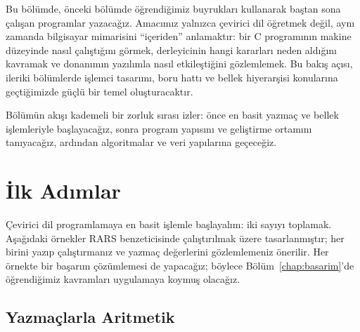 Bu bölümde, önceki bölümde öğrendiğimiz buyrukları kullanarak baştan sona çalışan programlar yazacağız. Amacımız yalnızca çevirici dil öğretmek değil, aynı zamanda bilgisayar mimarisini ``içeriden'' anlamaktır: bir C programının makine düzeyinde nasıl çalıştığını görmek, derleyicinin hangi kararları neden aldığını kavramak ve donanımın yazılımla nasıl etkileştiğini gözlemlemek. Bu bakış açısı, ileriki bölümlerde işlemci tasarımı, boru hattı ve bellek hiyerarşisi konularına geçtiğimizde güçlü bir temel oluşturacaktır.

Bölümün akışı kademeli bir zorluk sırası izler: önce en basit yazmaç ve bellek işlemleriyle başlayacağız, sonra program yapısını ve geliştirme ortamını tanıyacağız, ardından algoritmalar ve veri yapılarına geçeceğiz.


\section{İlk Adımlar}
\label{sec:ilk-adimlar}

Çevirici dil programlamaya en basit işlemle başlayalım: iki sayıyı toplamak. Aşağıdaki örnekler RARS benzeticisinde çalıştırılmak üzere tasarlanmıştır; her birini yazıp çalıştırmanız ve yazmaç değerlerini gözlemlemeniz önerilir. Her örnekte bir başarım çözümlemesi de yapacağız; böylece Bölüm~\ref{chap:basarim}'de öğrendiğimiz kavramları uygulamaya koymuş olacağız.

\subsection{Yazmaçlarla Aritmetik}
\label{subsec:yazmaclarla-aritmetik}

